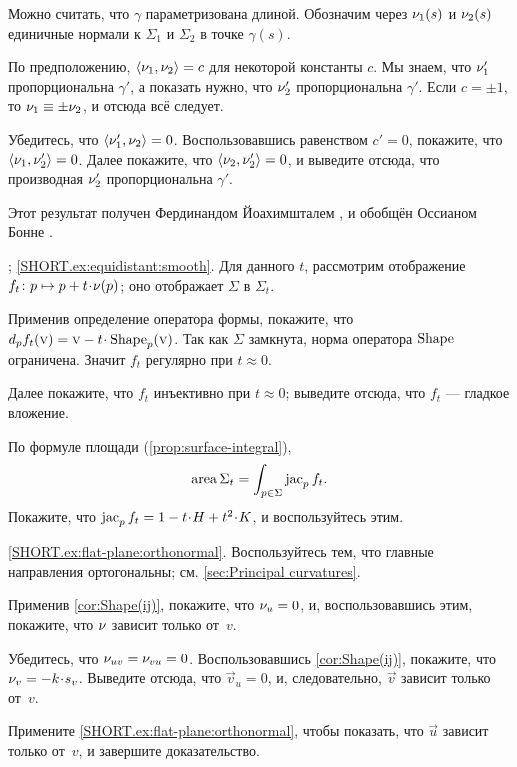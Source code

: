 Можно считать, что $\gamma$ параметризована длиной.
Обозначим через $\nu_1(s)$ и $\nu_2(s)$ единичные нормали к $\Sigma_1$ и $\Sigma_2$ в точке $\gamma(s)$.

По предположению, $\langle \nu_1,\nu_2\rangle= c$ для некоторой константы $c$.
Мы знаем, что
$\nu_1'$ пропорциональна $\gamma'$, а показать нужно, что $\nu_2'$ пропорциональна $\gamma'$.
Если $c=\pm1$, то $\nu_1\equiv\pm \nu_2$, и отсюда всё следует.

Убедитесь, что $\langle\nu_1',\nu_2\rangle=0$.
Воспользовавшись равенством $c'=0$, покажите, что $\langle\nu_1,\nu_2'\rangle=0$.
Далее покажите, что $\langle\nu_2,\nu_2'\rangle=0$, и выведите отсюда, что производная $\nu_2'$ пропорциональна $\gamma'$.

Этот результат получен Фердинандом Йоахимшталем \cite{joachimsthal}, и обобщён Оссианом Бонне \cite{bonnet}.

\parbf{\ref{ex:equidistant}};
\ref{SHORT.ex:equidistant:smooth}.
Для данного $t$, рассмотрим  отображение $f_t\:p\mapsto p+t\cdot\Norm(p)$; оно отображает $\Sigma$ в $\Sigma_t$.

Применив определение оператора формы, покажите, что $d_pf_t(\vec v)=\vec v-t\cdot\Shape_p(\vec v)$.
Так как $\Sigma$ замкнута, норма оператора $\mathop{\rm Shape}\nolimits$ ограничена.
Значит $f_t$ регулярно при $t\approx 0$.

Далее покажите, что $f_t$ инъективно при $t\approx0$;
выведите отсюда, что $f_t$ --- гладкое вложение.

По формуле площади (\ref{prop:surface-integral}), 
\[\mathop{\rm area}\nolimits\Sigma_t=\int_{p\in \Sigma}\mathop{\rm jac}\nolimits_pf_t.\]
Покажите, что $\jac_pf_t=1-t\cdot H+t^2\cdot K$, и воспользуйтесь этим.

\parbf{\ref{ex:flat-plane};} \ref{SHORT.ex:flat-plane:orthonormal}.
Воспользуйтесь тем, что главные направления ортогональны; см. \ref{sec:Principal curvatures}.

Применив \ref{cor:Shape(ij)}, покажите, что $\nu_u=0$, и, воспользовавшись этим, покажите, что $\nu$ зависит только от~$v$.

Убедитесь, что $\nu_{uv}=\nu_{vu}=0$.
Воспользовавшись \ref{cor:Shape(ij)}, покажите, что $\Norm_v\z=-k \cdot s_v$.
Выведите отсюда, что $\vec v_u=0$, и, следовательно, $\vec v$ зависит только от~$v$.

Примените \ref{SHORT.ex:flat-plane:orthonormal}, чтобы показать, что $\vec u$ зависит только от~$v$, и
завершите доказательство.

